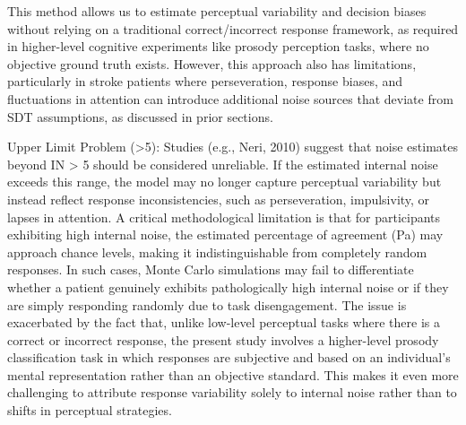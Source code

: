 This method allows us to estimate perceptual variability and decision biases without relying on a traditional correct/incorrect response framework, as required in higher-level cognitive experiments like prosody perception tasks, where no objective ground truth exists. However, this approach also has limitations, particularly in stroke patients where perseveration, response biases, and fluctuations in attention can introduce additional noise sources that deviate from SDT assumptions, as discussed in prior sections.

Upper Limit Problem (>5):
Studies (e.g., Neri, 2010) suggest that noise estimates beyond IN > 5 should be considered unreliable.
If the estimated internal noise exceeds this range, the model may no longer capture perceptual variability but instead reflect response inconsistencies, such as perseveration, impulsivity, or lapses in attention.
A critical methodological limitation is that for participants exhibiting high internal noise, the estimated percentage of agreement (Pa) may approach chance levels, making it indistinguishable from completely random responses. In such cases, Monte Carlo simulations may fail to differentiate whether a patient genuinely exhibits pathologically high internal noise or if they are simply responding randomly due to task disengagement. The issue is exacerbated by the fact that, unlike low-level perceptual tasks where there is a correct or incorrect response, the present study involves a higher-level prosody classification task in which responses are subjective and based on an individual’s mental representation rather than an objective standard. This makes it even more challenging to attribute response variability solely to internal noise rather than to shifts in perceptual strategies.


